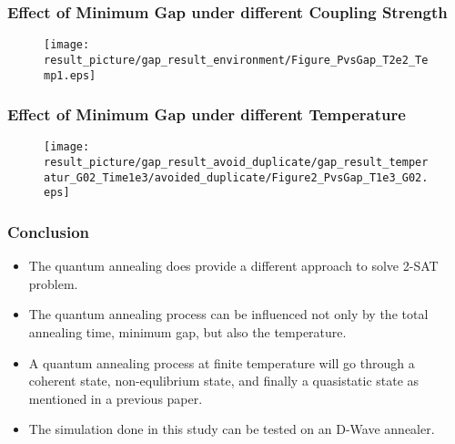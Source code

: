 \documentclass{beamer}
\begin{document}
\begin{frame}
	\frametitle{Effect of Minimum Gap under different Coupling Strength }

	\begin{figure}
		\centering
		\texttt{[image: result\_picture/gap\_result\_environment/Figure\_PvsGap\_T2e2\_Temp1.eps]}
		
	\end{figure}
\end{frame}

\begin{frame}
	\frametitle{Effect of Minimum Gap under different Temperature }
	
	\begin{figure}
		\centering
		\texttt{[image: result\_picture/gap\_result\_avoid\_duplicate/gap\_result\_temperatur\_G02\_Time1e3/avoided\_duplicate/Figure2\_PvsGap\_T1e3\_G02.eps]}	
	\end{figure}
\end{frame}

\begin{frame}
	\frametitle{Conclusion}
	\begin{itemize}
		\item The quantum annealing does provide a different approach to solve 2-SAT problem.
		\item The quantum annealing process can be influenced not only by the total annealing time, minimum gap, but also the temperature.
		\item A quantum annealing process at finite temperature will go through a coherent state, non-equlibrium state, and finally a quasistatic state as mentioned in a previous paper.
		\item The simulation done in this study can be tested on an D-Wave annealer.
	\end{itemize}
\end{frame}
\end{document}
